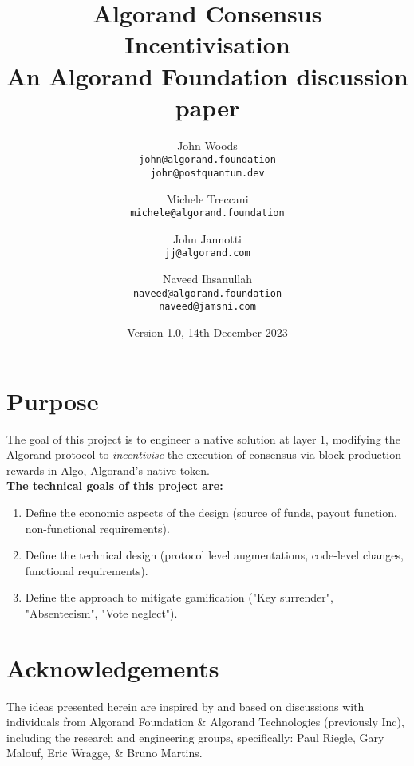 \documentclass[11pt,a4paper]{article}
\begin{document}
\title {Algorand Consensus Incentivisation \\
       {\large \sc An Algorand Foundation discussion paper}}
\date  {Version 1.0, 14th December 2023}
\author{
    John Woods \\ 
    {\small \texttt{john@algorand.foundation}} \\
    {\small \texttt{john@postquantum.dev}} \\
\and 
    Michele Treccani \\
    {\small \texttt{michele@algorand.foundation}}
\and 
    John Jannotti \\
    {\small \texttt{jj@algorand.com}}
\and 
    Naveed Ihsanullah \\
    {\small \texttt{naveed@algorand.foundation}} \\
    {\small \texttt{naveed@jamsni.com}}
}

\maketitle

\section{Purpose}
The goal of this project is to engineer a native solution at layer 1, modifying the Algorand protocol to 
\emph{incentivise} the execution of consensus via block production rewards in Algo, Algorand's native token. \\

\textbf{The technical goals of this project are:}

\begin{enumerate}
    \item Define the economic aspects of the design (source of funds, payout function, non-functional requirements). 
        
    \item Define the technical design (protocol level augmentations, code-level changes, functional requirements). 
        
    \item Define the approach to mitigate gamification ("Key surrender", "Absenteeism", "Vote neglect").
\end{enumerate}

\pagebreak

\tableofcontents

\pagebreak

\section{Acknowledgements}
The ideas presented herein are inspired by and based on discussions with individuals from Algorand Foundation \& 
Algorand Technologies (previously Inc), including the research and engineering groups, specifically: Paul Riegle, 
Gary Malouf, Eric Wragge, \& Bruno Martins.
\end{document}
